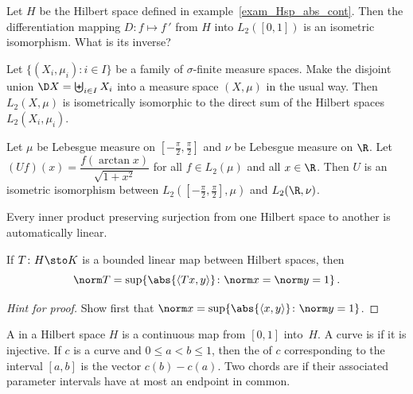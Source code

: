 \begin{exam} Let $H$ be the Hilbert space defined in example~\ref{exam_Hsp_abs_cont}.  Then the differentiation mapping
$D\colon f \mapsto f\,'$ from $H$ into $L_2([0,1])$ is an isometric isomorphism.  What is its inverse?
\end{exam}

\begin{exam} Let $\{(X_i,\mu_i) \colon i \in I\}$ be a family of $\sigma$-finite measure spaces. Make the disjoint union
$\D X = \biguplus_{i \in I}X_i$ into a measure space $(X,\mu)$ in the usual way.  Then $L_2(X,\mu)$ is isometrically
isomorphic to the direct sum of the Hilbert spaces $L_2(X_i,\mu_i)$.
\end{exam}

\begin{exam} Let $\mu$ be Lebesgue measure on $[-\frac\pi2, \frac\pi2]$ and $\nu$ be Lebesgue measure on $\R$.
Let $(Uf)(x) = \dfrac{f(\arctan x)}{\sqrt{1+x^2}}$ for all $f \in L_2(\mu)$ and all $x \in \R$.  Then $U$ is an
isometric isomorphism between $L_2([-\frac\pi2, \frac\pi2], \mu)$ and $L_2(\R, \nu)$.
\end{exam}

\begin{prop} Every inner product preserving surjection from one Hilbert space to another is automatically linear.
\end{prop}

\begin{prop}\label{prop_norm_lin_map} If $T\colon H \sto K$ is a bounded linear map between Hilbert spaces, then
   \[ \norm T = \sup\{\abs{\langle Tx,y \rangle}\colon \norm x = \norm y = 1\}\,. \]
\end{prop}

\begin{proof}[\emph{Hint for proof}] Show first that $\norm x = \sup\{\abs{\langle x,y \rangle}\colon \norm y = 1\}$.  \ns
\end{proof}

\begin{defn} A
 in a Hilbert space $H$ is a continuous map from $[0,1]$ into~$H$. A curve is
 if it is injective.  If $c$ is a curve and $0 \le a < b \le 1$, then the
 of $c$ corresponding to the interval $[a,b]$ is the vector $c(b) - c(a)$.  Two chords are
 if their associated parameter intervals have at most an endpoint in common.
\end{defn}

